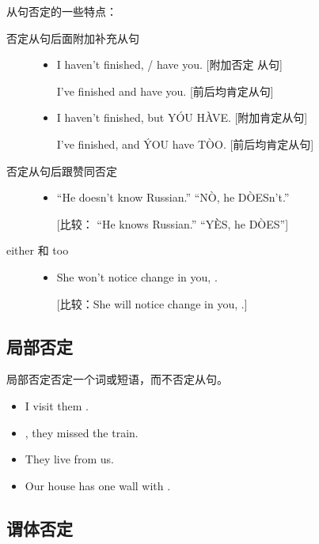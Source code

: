 从句否定的一些特点：
\begin{description}
\item[否定从句后面附加补充从句]
  \begin{itemize}
  \item I haven't finished, / have you. [附加否定
    从句]

    I've finished and  have you. [前后均肯定从句]

  \item I haven't finished, but Y\'OU H\`AVE. [附加肯定从句]

    I've finished, and \'YOU have T\`OO. [前后均肯定从句]
  \end{itemize}

\item[否定从句后跟赞同否定]
  \begin{itemize}
  \item ``He doesn't know Russian.'' ``N\`O, he D\`OESn't.''

    [比较： ``He knows Russian.'' ``Y\`ES, he D\`OES'']
  \end{itemize}

\item[either 和 too]
  \begin{itemize}
  \item She won't notice  change in you, .

    [比较：She will notice  change in you, .]
  \end{itemize}
\end{description}

\subsection{局部否定}

局部否定否定一个词或短语，而不否定从句。
\begin{itemize}
\item I visit them .

\item {}, they missed the train.

\item They live  from us.

\item Our house has one wall with .
\end{itemize}

\subsection{谓体否定}

